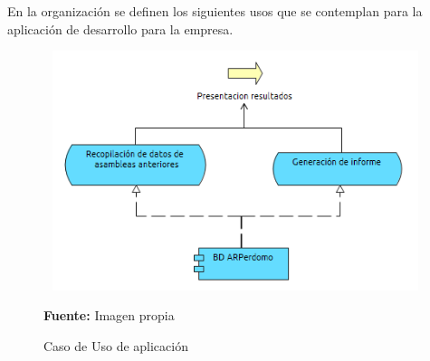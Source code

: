 En la organización se definen los siguientes usos que se contemplan para la aplicación de desarrollo para la empresa.

\begin{figure}[th!]
	\centering
	\includegraphics[width=13cm,height=7cm]{arquitectura/aplicacion/imgs/uso}
	\caption{Caso de Uso de aplicación}{\scriptsize \textbf{Fuente:} Imagen propia}
\end{figure}
\newpage